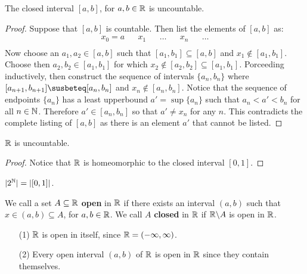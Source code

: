 \begin{theorem}\label{thm_3.14}
    The closed interval $[a,b]$, for $a,b \in \mathbb{R}$ is uncountable.
\end{theorem}
\begin{proof}
    Suppose that $[a,b]$ is countable. Then list the elements of $[a,b]$ as:
    \begin{align*}
        x_0=a   &&  x_1     &&      \dots       &&      x_n     &&  \dots   \\
    \end{align*}
    Now choose an $a_1,a_2 \in [a,b]$ such that $[a_1,b_1] \subseteq [a,b]$ and
    $x_1 \notin [a_1,b_1]$. Choose then $a_2,b_2 \in [a_1,b_1]$ for which $x_2
    \notin [a_2,b_2] \subseteq [a_1,b_1]$. Porceeding inductively, then
    construct the sequence of intervals $\{a_n,b_n\}$ where $[a_{n+1},b_{n+1}]
    \susbeteq [a_n,b_n]$ and $x_n \notin [a_n,b_n]$. Notice that the sequence of
    endpoints $\{a_n\}$ has a least upperbound  $a'=\sup{\{a_n\}}$ such that
    $a_n<a'<b_n$ for all  $n \in \mathbb{N}$. Therefore  $a' \in [a_n,b_n]$ so that $a'
    \neq x_n$ for any  $n$. This contradicts the complete listing of  $[a,b]$ as
    there is an element $a'$ that cannot be listed.
\end{proof}
\begin{corollary}
    $\mathbb{R}$ is uncountable.
\end{corollary}
\begin{proof}
    Notice that $\mathbb{R}$ is homeomorphic to the closed interval  $[0,1]$.
\end{proof}
\begin{corollary}
    $|2^{\mathbb{N}}|=|[0,1]|$.
\end{corollary}

\begin{definition}
    We call a set $A \subseteq \mathbb{R}$  \textbf{open} in $\mathbb{R}$ if there exists an
    interval  $(a,b)$ such that $x \in (a,b) \subseteq A$, for $a,b \in \mathbb{R}$. We
    call  $A$  \textbf{closed} in $\mathbb{R}$ if  $\mathbb{R}\backslash A$ is open in $\mathbb{R}$.
\end{definition}

\begin{example}\label{}
    \begin{enumerate}
        \item[(1)] $\mathbb{R}$ is open in itself, since  $\mathbb{R}=(-\infty,\infty)$.

        \item[(2)] Every open interval $(a,b)$ of $\mathbb{R}$ is open in $\mathbb{R}$ since
            they contain themselves.
    \end{enumerate}
\end{example}

